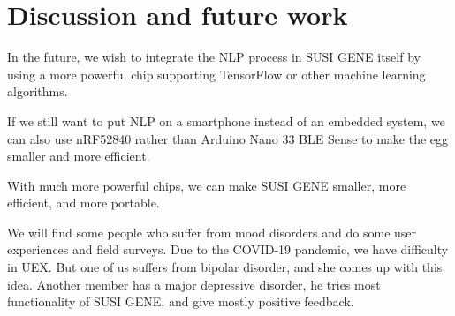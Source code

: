 \documentclass[manuscript,screen]{acmart}
\begin{document}
\section{Discussion and future work}

In the future, we wish to integrate the NLP process in SUSI GENE itself by using a more powerful chip supporting TensorFlow or other machine learning algorithms. 

If we still want to put NLP on a smartphone instead of an embedded system, we can also use nRF52840 rather than Arduino Nano 33 BLE Sense to make the egg smaller and more efficient.

With much more powerful chips, we can make SUSI GENE smaller, more efficient, and more portable. 

We will find some people who suffer from mood disorders and do some user experiences and field surveys. Due to the COVID-19 pandemic, we have difficulty in UEX. But one of us suffers from bipolar disorder, and she comes up with this idea. Another member has a major depressive disorder, he tries most functionality of SUSI GENE, and give mostly positive feedback.



\end{document}
